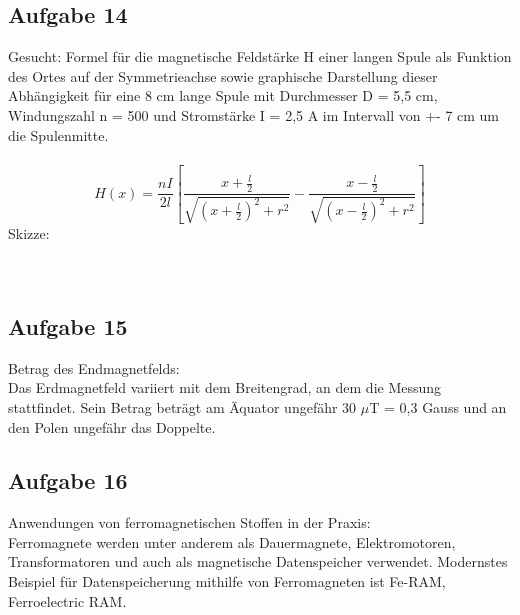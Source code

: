 \documentclass[a4paper,10pt]{scrartcl}
\begin{document}
\subsection{Aufgabe 14}
Gesucht: Formel für die magnetische Feldstärke H einer langen Spule als Funktion des Ortes auf der Symmetrieachse sowie graphische Darstellung dieser Abhängigkeit für eine 8 cm lange Spule mit Durchmesser D = 5,5 cm,  Windungszahl n = 500 und Stromstärke I = 2,5 A im Intervall von +- 7 cm um die Spulenmitte. \\ \\
\begin{equation}
	H(x) = \frac{nI}{2l} [\frac{x+\frac{l}{2}}{\sqrt{(x+\frac{l}{2})^2+r^2}}-\frac{x-\frac{l}{2}}{\sqrt{(x-\frac{l}{2})^2+r^2}}]
\end{equation}
Skizze: \\ \\ \\ 

\subsection{Aufgabe 15}
Betrag des Endmagnetfelds: \\
Das Erdmagnetfeld variiert mit dem Breitengrad, an dem die Messung stattfindet. Sein Betrag beträgt am Äquator ungefähr 30 $\mu$T = 0,3 Gauss und an den Polen ungefähr das Doppelte.
\subsection{Aufgabe 16}
Anwendungen von ferromagnetischen Stoffen in der Praxis: \\
Ferromagnete werden unter anderem als Dauermagnete, Elektromotoren, Transformatoren und auch als magnetische Datenspeicher verwendet. Modernstes Beispiel für Datenspeicherung mithilfe von Ferromagneten ist Fe-RAM, Ferroelectric RAM.

	
\end{document}
